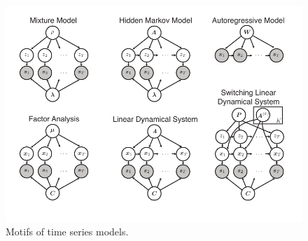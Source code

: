 \begin{figure}[t]
\centering%
\includegraphics[width=5.5in]{figures/ch1/figure2} 
\vspace{-.25in}
\caption[Motifs of time series models]{Motifs of time series models.}
\label{fig:motifs}
\end{figure}



